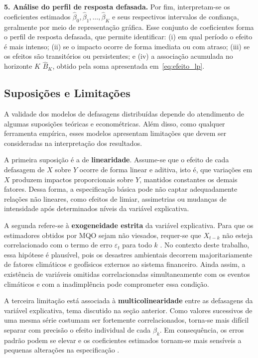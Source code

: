\textbf{5. Análise do perfil de resposta defasada.} Por fim, interpretam-se os
coeficientes estimados $\hat{\beta}_0, \hat{\beta}_1, \ldots, \hat{\beta}_K$ e seus
respectivos intervalos de confiança, geralmente por meio de representação gráfica.
Esse conjunto de coeficientes forma o perfil de resposta defasada, que permite
identificar: (i) em qual período o efeito é mais intenso; (ii) se o impacto ocorre
de forma imediata ou com atraso; (iii) se os efeitos são transitórios ou
persistentes; e (iv) a associação acumulada no horizonte $K$ $\hat{B}_K$, obtido
pela soma apresentada em~\eqref{eq:efeito_lp}.

\subsection{Suposições e Limitações}

A validade dos modelos de defasagens distribuídas depende do atendimento de algumas
suposições teóricas e econométricas. Além disso, como qualquer ferramenta empírica,
esses modelos apresentam limitações que devem ser consideradas na interpretação dos
resultados.

A primeira suposição é a de \textbf{linearidade}. Assume-se que o efeito de cada
defasagem de $X$ sobre $Y$ ocorre de forma linear e aditiva, isto é, que variações
em $X$ produzem impactos proporcionais sobre $Y$, mantidos constantes os demais
fatores. Dessa forma, a especificação básica pode não captar adequadamente relações
não lineares, como efeitos de limiar, assimetrias ou mudanças de intensidade após
determinados níveis da variável explicativa.

A segunda refere-se à \textbf{exogeneidade estrita} da variável explicativa. Para
que os estimadores obtidos por MQO sejam não viesados, requer-se que $X_{t-k}$ não
esteja correlacionado com o termo de erro $\varepsilon_t$ para todo $k$
\citep{wooldridge2010}. No contexto deste trabalho, essa hipótese é plausível, pois
os desastres ambientais decorrem majoritariamente de fatores climáticos e
geofísicos externos ao sistema financeiro. Ainda assim, a existência de variáveis
omitidas correlacionadas simultaneamente com os eventos climáticos e com a
inadimplência pode comprometer essa condição.

A terceira limitação está associada à \textbf{multicolinearidade} entre as
defasagens da variável explicativa, tema discutido na seção anterior. Como valores
sucessivos de uma mesma série costumam ser fortemente correlacionados, torna-se mais
difícil separar com precisão o efeito individual de cada $\beta_k$. Em consequência,
os erros padrão podem se elevar e os coeficientes estimados tornam-se mais sensíveis
a pequenas alterações na especificação \citep{judge1985}.

